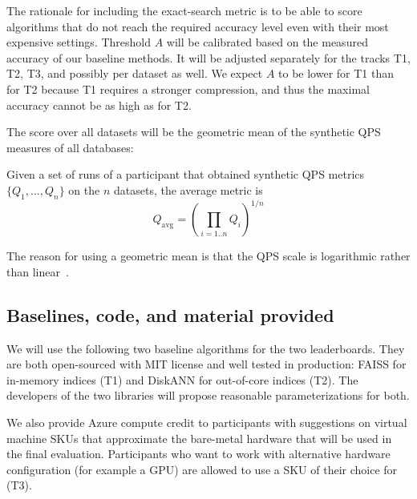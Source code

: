 The rationale for including the exact-search metric is to be able to score algorithms that do not reach the required accuracy level even with their most expensive settings.
Threshold $A$ will be calibrated based on the measured accuracy of our baseline methods. 
It will be adjusted separately for the tracks T1, T2, T3, and possibly per dataset as well. 
We expect $A$ to be lower for T1 than for T2 because T1 requires a stronger compression, and thus the maximal accuracy cannot be as high as for T2.


The score over all datasets will be the geometric mean of the synthetic QPS measures of all databases:
\begin{definition}
  \label{def:averagedmetric}
  Given a set of runs of a participant that obtained synthetic QPS metrics $\{Q_1,...,Q_n\}$ on the $n$ datasets, the average metric is 
  \[
  Q_\mathrm{avg} = \left( 
\prod_{i=1..n} Q_i
  \right)^{1/n} 
  \]
\end{definition}
% 
The reason for using a geometric mean is that the QPS scale is logarithmic rather than linear~\cite{Benchmark,FaissBenchmarks}.

\fi 

\subsection{Baselines, code, and material provided}

We will use the following two baseline algorithms for the two
leaderboards.  They are both open-sourced with MIT license and well
tested in production: FAISS for in-memory indices (T1) and DiskANN for out-of-core indices (T2). 
The developers of the two libraries will propose reasonable parameterizations for both.
\iffalse 
\begin{itemize}
  \item FAISS for in-memory indices (T1). 
    \url{https://github.com/facebookresearch/faiss}
  \item DiskANN for out-of-core indices (T2).
    \url{https://github.com/microsoft/DiskANN}
\end{itemize}
\fi

\iffalse 
In addition to the data and corresponding ground-truth listed earlier,
we will provide a 1\% and 10\% sample of the dataset (10M and
100M points respectively) for participants to develop, debug and
optimize their code with shorter turn-around times.
\fi

We also provide Azure compute credit to participants with
suggestions on virtual machine SKUs that approximate the bare-metal
hardware that will be used in the final evaluation.  Participants who
want to work with alternative hardware configuration (for example a
GPU) are allowed to use a SKU of their choice for (T3).


